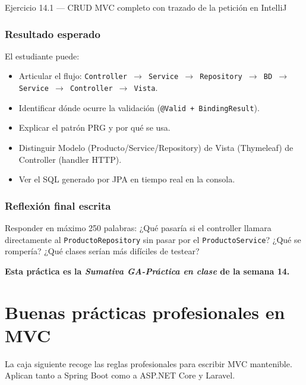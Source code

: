 \documentclass[11pt,a4paper,openany]{book}
\begin{document}
\begin{cajaejercicio}{Ejercicio 14.1 --- CRUD MVC completo con trazado de la petición en IntelliJ}
\subsubsection*{Resultado esperado}

El estudiante puede:
\begin{itemize}
\item Articular el flujo: \texttt{Controller $\to$ Service $\to$
Repository $\to$ BD $\to$ Service $\to$ Controller $\to$ Vista}.
\item Identificar dónde ocurre la validación
(\texttt{@Valid + BindingResult}).
\item Explicar el patrón PRG y por qué se usa.
\item Distinguir Modelo (Producto/Service/Repository) de Vista
(Thymeleaf) de Controller (handler HTTP).
\item Ver el SQL generado por JPA en tiempo real en la consola.
\end{itemize}

\subsubsection*{Reflexión final escrita}

Responder en máximo 250 palabras: ¿Qué pasaría si el controller
llamara directamente al \texttt{ProductoRepository} sin pasar por el
\texttt{ProductoService}? ¿Qué se rompería? ¿Qué clases serían más
difíciles de testear?

\textbf{Esta práctica es la \emph{Sumativa GA-Práctica en clase} de
la semana 14.}
\end{cajaejercicio}

\section{Buenas prácticas profesionales en MVC}

La caja siguiente recoge las reglas profesionales para
escribir MVC mantenible. Aplican tanto a Spring Boot como a
ASP.NET Core y Laravel.
\end{document}
